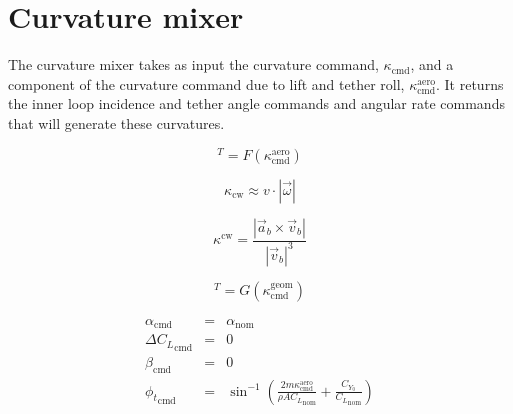 \documentclass{article} %
\newcommand{\cmd}{\mathrm{cmd}}
\newcommand{\nom}{\mathrm{nom}}
\newcommand{\aero}{\mathrm{aero}}
\newcommand{\geom}{\mathrm{geom}}
\newcommand{\cw}{\mathrm{cw}}
\begin{document}
\section{Curvature mixer}

The curvature mixer takes as input the curvature command,
$\kappa_{\cmd}$, and a component of the curvature command due to lift
and tether roll, $\kappa^{\aero}_{\cmd}$.  It returns the inner loop
incidence and tether angle commands and angular rate commands that
will generate these curvatures.

\begin{equation}
[\alpha_{\cmd},\; \Delta {C_L}_{\cmd},\; \beta_{\cmd},\; {\phi_t}_{\cmd}]^T
= F(\kappa_{\cmd}^{\aero})
\end{equation}


\begin{equation}
\kappa_{\cw} \approx v \cdot |\vec{\omega}|
\end{equation}


\begin{equation}
\kappa^{\cw} = \frac{|\vec{a}_b \times \vec{v}_b|}{|\vec{v}_b|^3}
\end{equation}

\begin{equation}
[p_{\cmd},\; r_{\cmd}]^T = G(\kappa_{\cmd}^{\geom})
\end{equation}

\begin{eqnarray}
\alpha_{\cmd} &=& \alpha_{\nom} \\
\Delta {C_L}_{\cmd} &=& 0 \\
\beta_{\cmd} &=& 0 \\
{\phi_t}_{\cmd} &=& \sin^{-1} \left(
\frac{2 m \kappa_{\cmd}^{\aero}}{\rho A {C_L}_{\nom}} +
\frac{C_{Y_0}}{{C_L}_{\nom}} \right)
\end{eqnarray}
\end{document}
